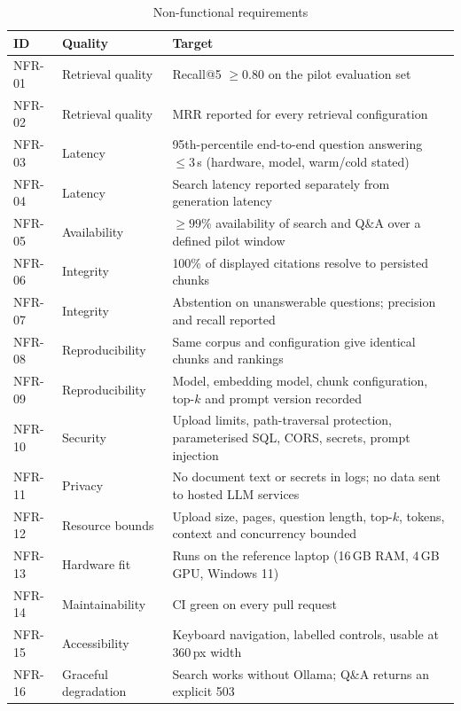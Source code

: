 \begin{table}[htbp]
  \centering
  \caption{Non-functional requirements}\label{tab:nfr}
  {\small
  \begin{tabularx}{\textwidth}{@{}llL@{}}
    \toprule
    \textbf{ID} & \textbf{Quality} & \textbf{Target} \\
    \midrule
    NFR-01 & Retrieval quality & Recall@5 $\geq 0.80$ on the pilot evaluation set \\
    NFR-02 & Retrieval quality & MRR reported for every retrieval configuration \\
    NFR-03 & Latency & 95th-percentile end-to-end question answering $\leq 3$\,s (hardware, model, warm/cold stated) \\
    NFR-04 & Latency & Search latency reported separately from generation latency \\
    NFR-05 & Availability & $\geq 99\%$ availability of search and Q\&A over a defined pilot window \\
    NFR-06 & Integrity & 100\% of displayed citations resolve to persisted chunks \\
    NFR-07 & Integrity & Abstention on unanswerable questions; precision and recall reported \\
    NFR-08 & Reproducibility & Same corpus and configuration give identical chunks and rankings \\
    NFR-09 & Reproducibility & Model, embedding model, chunk configuration, top-$k$ and prompt version recorded \\
    NFR-10 & Security & Upload limits, path-traversal protection, parameterised SQL, CORS, secrets, prompt injection \\
    NFR-11 & Privacy & No document text or secrets in logs; no data sent to hosted LLM services \\
    NFR-12 & Resource bounds & Upload size, pages, question length, top-$k$, tokens, context and concurrency bounded \\
    NFR-13 & Hardware fit & Runs on the reference laptop (16\,GB RAM, 4\,GB GPU, Windows 11) \\
    NFR-14 & Maintainability & CI green on every pull request \\
    NFR-15 & Accessibility & Keyboard navigation, labelled controls, usable at 360\,px width \\
    NFR-16 & Graceful degradation & Search works without Ollama; Q\&A returns an explicit 503 \\
    \bottomrule
  \end{tabularx}
  }
\end{table}

